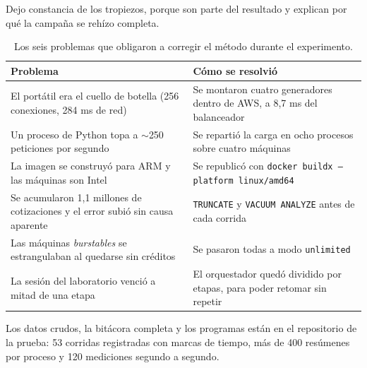 \documentclass[11pt]{article}
\begin{document}
Dejo constancia de los tropiezos, porque son parte del resultado y explican por qué la campaña se
rehízo completa.

\begin{table}[H]
\centering
\small
\begin{tabular}{L{6.2cm} L{9.3cm}}
\toprule
Problema & Cómo se resolvió \\
\midrule
El portátil era el cuello de botella (256 conexiones, 284 ms de red) & Se montaron cuatro generadores dentro de AWS, a 8,7 ms del balanceador \\
Un proceso de Python topa a $\sim$250 peticiones por segundo & Se repartió la carga en ocho procesos sobre cuatro máquinas \\
La imagen se construyó para ARM y las máquinas son Intel & Se republicó con \texttt{docker buildx --platform linux/amd64} \\
Se acumularon 1,1 millones de cotizaciones y el error subió sin causa aparente & \texttt{TRUNCATE} y \texttt{VACUUM ANALYZE} antes de cada corrida \\
Las máquinas \textit{burstables} se estrangulaban al quedarse sin créditos & Se pasaron todas a modo \texttt{unlimited} \\
La sesión del laboratorio venció a mitad de una etapa & El orquestador quedó dividido por etapas, para poder retomar sin repetir \\
\bottomrule
\end{tabular}
\caption{Los seis problemas que obligaron a corregir el método durante el experimento.}
\end{table}

Los datos crudos, la bitácora completa y los programas están en el repositorio de la prueba: 53
corridas registradas con marcas de tiempo, más de 400 resúmenes por proceso y 120 mediciones
segundo a segundo.
\end{document}
